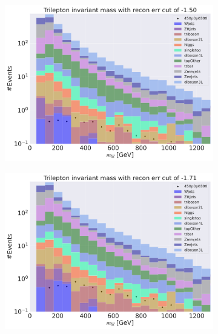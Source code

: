 \begin{figure}[H]
    \centering
    \begin{subfigure}{.45\textwidth}
        \includegraphics[width=\textwidth]{Figures/AE_testing/big/3lep/b_data_recon_big_rm3_feats_sig_450p0p0300_mlll_recon_errcut_-1.50.pdf}
        \caption{ }
        \label{fig:AE_3lep_big_450_cut_mlll}
    \end{subfigure}
    \hfill
    \begin{subfigure}{.45\textwidth}
        \includegraphics[width=\textwidth]{Figures/AE_testing/small/3lep/b_data_recon_big_rm3_feats_sig_450p0p0300_mlll_recon_errcut_-1.71.pdf}
        \caption{}
        \label{fig:AE_3lep_small_450_cut_mlll}
    \end{subfigure}

\end{figure}
